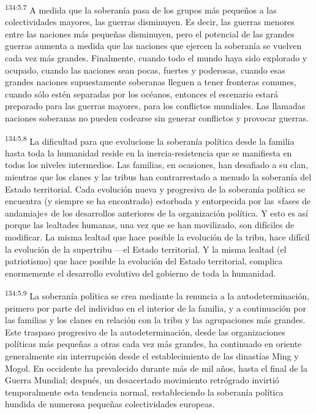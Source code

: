 \par
\textsuperscript{134:5.7} A medida que la soberanía pasa de los grupos más pequeños a las colectividades mayores, las guerras disminuyen. Es decir, las guerras menores entre las naciones más pequeñas disminuyen, pero el potencial de las grandes guerras aumenta a medida que las naciones que ejercen la soberanía se vuelven cada vez más grandes. Finalmente, cuando todo el mundo haya sido explorado y ocupado, cuando las naciones sean pocas, fuertes y poderosas, cuando esas grandes naciones supuestamente soberanas lleguen a tener fronteras comunes, cuando sólo estén separadas por los océanos, entonces el escenario estará preparado para las guerras mayores, para los conflictos mundiales. Las llamadas naciones soberanas no pueden codearse sin generar conflictos y provocar guerras.

\par
\textsuperscript{134:5.8} La dificultad para que evolucione la soberanía política desde la familia hasta toda la humanidad reside en la inercia-resistencia que se manifiesta en todos los niveles intermedios. Las familias, en ocasiones, han desafiado a su clan, mientras que los clanes y las tribus han contrarrestado a menudo la soberanía del Estado territorial. Cada evolución nueva y progresiva de la soberanía política se encuentra (y siempre se ha encontrado) estorbada y entorpecida por las «fases de andamiaje» de los desarrollos anteriores de la organización política. Y esto es así porque las lealtades humanas, una vez que se han movilizado, son difíciles de modificar. La misma lealtad que hace posible la evolución de la tribu, hace difícil la evolución de la supertribu ---el Estado territorial. Y la misma lealtad (el patriotismo) que hace posible la evolución del Estado territorial, complica enormemente el desarrollo evolutivo del gobierno de toda la humanidad.

\par
\textsuperscript{134:5.9} La soberanía política se crea mediante la renuncia a la autodeterminación, primero por parte del individuo en el interior de la familia, y a continuación por las familias y los clanes en relación con la tribu y las agrupaciones más grandes. Este traspaso progresivo de la autodeterminación, desde las organizaciones políticas más pequeñas a otras cada vez más grandes, ha continuado en oriente generalmente sin interrupción desde el establecimiento de las dinastías Ming y Mogol. En occidente ha prevalecido durante más de mil años, hasta el final de la Guerra Mundial; después, un desacertado movimiento retrógrado invirtió temporalmente esta tendencia normal, restableciendo la soberanía política hundida de numerosa pequeñas colectividades europeas.

